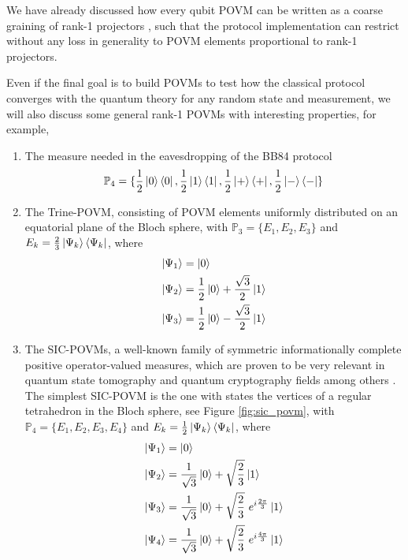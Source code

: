 We have already discussed how every qubit POVM can be written as a coarse graining of rank-1 projectors \cite{barrett2002}, such that the protocol implementation can restrict without any loss in generality to POVM elements proportional to rank-1 projectors. 

Even if the final goal is to build POVMs to test how the classical protocol converges with the quantum theory for any random state and measurement, we will also discuss some general rank-1 POVMs with interesting properties, for example, 
\begin{enumerate}
    \item The measure needed in the eavesdropping  of the BB84 protocol \cite{nielsen2000}
\begin{equation}\label{eq:cross-povm}
    \mathbb{P}_4 = \{\frac{1}{2}\ket{0}\bra{0}, \frac{1}{2}\ket{1}\bra{1}, \frac{1}{2}\ket{+}\bra{+}, \frac{1}{2}\ket{-}\bra{-} \}
\end{equation}
    \item The Trine-POVM, consisting of POVM elements uniformly distributed on an equatorial plane of the Bloch sphere, with $\mathbb{P}_3=\{E_1, E_2, E_3\}$ and $E_k=\frac{2}{3}\ket{\Psi_{k}}\bra{\Psi_{k}}$, where
\begin{equation}\label{eq:trine-povm}
\begin{split}
\ket{\Psi_1}&=\ket{0}\\
\ket{\Psi_2}&=\frac{1}{2}\ket{0} + \frac{\sqrt{3}}{2} \ket{1}\\ 
\ket{\Psi_3}&=\frac{1}{2}\ket{0} - \frac{\sqrt{3}}{2} \ket{1}
\end{split}
\end{equation}
    \item The SIC-POVMs, a well-known family of symmetric informationally complete positive operator-valued measures, which are proven to be very relevant in quantum state tomography and quantum cryptography fields among others \cite{renes2004}. The simplest SIC-POVM is the one with states the vertices of a regular tetrahedron in the Bloch sphere, see Figure \ref{fig:sic_povm}, with $\mathbb{P}_4=\{E_1, E_2, E_3, E_4\}$ and $E_k=\frac{1}{2}\ket{\Psi_{k}}\bra{\Psi_{k}}$, where
\begin{equation}\label{eq:sic-povm}
\begin{split}
\ket{\Psi_1}&=\ket{0}\\ 
\ket{\Psi_2}&=\frac{1}{\sqrt{3}}\ket{0} + \sqrt{\frac{2}{3}} \ket{1}\\
\ket{\Psi_3}&=\frac{1}{\sqrt{3}}\ket{0} + \sqrt{\frac{2}{3}} \ e^{i\frac{2\pi}{3}} \ket{1}\\ 
\ket{\Psi_4}&=\frac{1}{\sqrt{3}}\ket{0} + \sqrt{\frac{2}{3}}\ e^{i\frac{4\pi}{3}} \ket{1}
\end{split}
\end{equation}
\end{enumerate}

